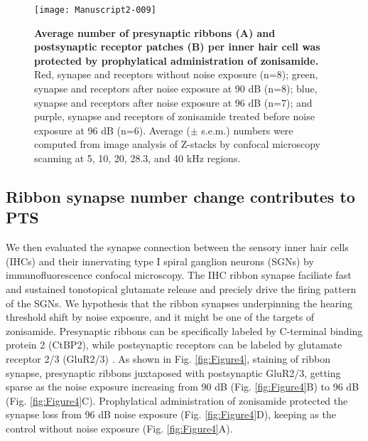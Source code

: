 \documentclass[11pt]{article}
\begin{document}
\begin{figure}[ht!]
\centering
\texttt{[image: Manuscript2-009]}
\caption{{\bf {Average number of presynaptic ribbons (A) and postsynaptic receptor patches (B) per inner hair cell was protected by prophylatical administration of zonisamide.}}  Red, synapse and receptors without noise exposure (n=8); green, synapse and receptors after noise exposure at 90 dB (n=8); blue, synapse and receptors after noise exposure at 96 dB (n=7); and purple, synapse and receptors of zonisamide treated before noise exposure at 96 dB (n=6). Average ($\pm$ s.e.m.) numbers were computed from image analysis of Z-stacks by confocal microscopy scanning at 5, 10, 20, 28.3, and 40 kHz regions.}
\label{fig:Figure5}
\end{figure}


\subsection {Ribbon synapse number change contributes to PTS}
We then evaluated the synapse connection between the sensory inner hair cells (IHCs) and their innervating type I spiral ganglion neurons (SGNs) by immunofluorescence confocal microscopy. The IHC ribbon synapse faciliate fast and sustained tonotopical glutamate release and preciely drive the firing pattern of the SGNs. We hypothesis that the ribbon synapses underpinning the hearing threshold shift by noise exposure, and it might be one of the targets of zonisamide. Presynaptic ribbons can be specifically labeled by C-terminal binding protein 2 (CtBP2), while postsynaptic receptors can be labeled by glutamate receptor 2/3 (GluR2/3) \cite{Khimich2005,Liberman2011}. As shown in Fig. \ref{fig:Figure4}, staining of ribbon synapse, presynaptic ribbons juxtaposed with postsynaptic GluR2/3, getting sparse as the noise exposure increasing from 90 dB (Fig. \ref{fig:Figure4}B) to 96 dB (Fig. \ref{fig:Figure4}C). Prophylatical administration of zonisamide protected the synapse loss from 96 dB noise exposure (Fig. \ref{fig:Figure4}D), keeping as the control without noise exposure (Fig. \ref{fig:Figure4}A). 
\end{document}
